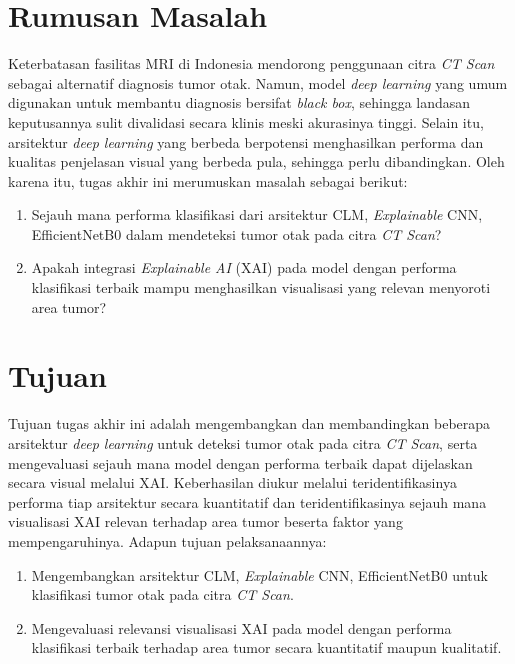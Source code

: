 \section{Rumusan Masalah}
Keterbatasan fasilitas MRI di Indonesia mendorong penggunaan citra \textit{CT Scan} sebagai alternatif diagnosis tumor otak. Namun, model \textit{deep learning} yang umum digunakan untuk membantu diagnosis bersifat \textit{black box}, sehingga landasan keputusannya sulit divalidasi secara klinis meski akurasinya tinggi. Selain itu, arsitektur \textit{deep learning} yang berbeda berpotensi menghasilkan performa dan kualitas penjelasan visual yang berbeda pula, sehingga perlu dibandingkan. Oleh karena itu, tugas akhir ini merumuskan masalah sebagai berikut:
\begin{enumerate}
	\item Sejauh mana performa klasifikasi dari arsitektur CLM, \textit{Explainable} CNN, EfficientNetB0 dalam mendeteksi tumor otak pada citra \textit{CT Scan}?
	\item Apakah integrasi \textit{Explainable AI} (XAI) pada model dengan performa klasifikasi terbaik mampu menghasilkan visualisasi yang relevan menyoroti area tumor?
\end{enumerate}


\section{Tujuan}
Tujuan tugas akhir ini adalah mengembangkan dan membandingkan beberapa arsitektur \textit{deep learning} untuk deteksi tumor otak pada citra \textit{CT Scan}, serta mengevaluasi sejauh mana model dengan performa terbaik dapat dijelaskan secara visual melalui XAI. Keberhasilan diukur melalui teridentifikasinya performa tiap arsitektur secara kuantitatif dan teridentifikasinya sejauh mana visualisasi XAI relevan terhadap area tumor beserta faktor yang mempengaruhinya. Adapun tujuan pelaksanaannya:
\begin{enumerate}
	\item Mengembangkan arsitektur CLM, \textit{Explainable} CNN, EfficientNetB0 untuk klasifikasi tumor otak pada citra \textit{CT Scan}.
	\item Mengevaluasi relevansi visualisasi XAI pada model dengan performa klasifikasi terbaik terhadap area tumor secara kuantitatif maupun kualitatif.
\end{enumerate}

